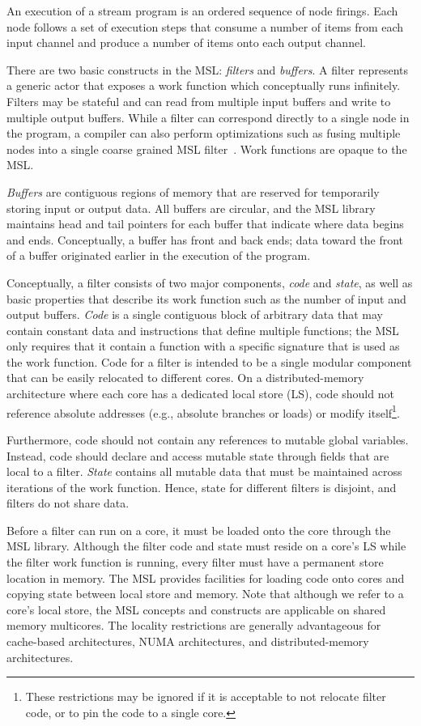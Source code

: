 An execution of a stream program is an ordered sequence of node
firings. Each node follows a set of execution steps that consume a
number of items from each input channel and produce a number of items
onto each output channel.

There are two basic constructs in the MSL: \emph{filters} and
\emph{buffers}. A filter represents a generic actor that exposes a
work function which conceptually runs infinitely. Filters may be
stateful and can read from multiple input buffers and write to multiple
output buffers. While a filter can correspond directly to a
single node in the program, a compiler can also perform
optimizations such as fusing multiple nodes into a single
coarse grained MSL filter~\cite{asplos02}. Work functions are opaque to the MSL.

\emph{Buffers} are contiguous regions of memory that are reserved for
temporarily storing input or output data. All buffers are circular,
and the MSL library maintains head and tail pointers for each buffer
that indicate where data begins and ends. Conceptually, a buffer has
front and back ends; data toward the front of a buffer originated
earlier in the execution of the program.

Conceptually, a filter consists of two major components, \emph{code}
and \emph{state}, as well as basic properties that describe its work
function such as the number of input and output buffers. \emph{Code}
is a single contiguous block of arbitrary data that may contain
constant data and instructions that define multiple functions; the MSL
only requires that it contain a function with a specific signature
that is used as the work function. Code for a filter is intended to be
a single modular component that can be easily relocated to different
cores. On a distributed-memory architecture where each core has a
dedicated local store (LS), code should not reference absolute
addresses (e.g., absolute branches or loads) or modify
itself\footnote{These restrictions may be ignored if it is acceptable
to not relocate filter code, or to pin the code to a single core.}.

Furthermore, code should not contain any references to mutable global
variables. Instead, code should declare and access mutable state
through fields that are local to a filter. \emph{State} contains all
mutable data that must be maintained across iterations of the work
function. Hence, state for different filters is disjoint, and filters
do not share data.

Before a filter can run on a core, it must be loaded onto the core
through the MSL library. Although the filter code and state must
reside on a core's LS while the filter work function is running, every
filter must have a permanent store location in memory. The MSL
provides facilities for loading code onto cores and copying state
between local store and memory. Note that although we refer to a
core's local store, the MSL concepts and constructs are applicable on
shared memory multicores. The locality restrictions are generally
advantageous for cache-based architectures, NUMA architectures, and
distributed-memory architectures.

